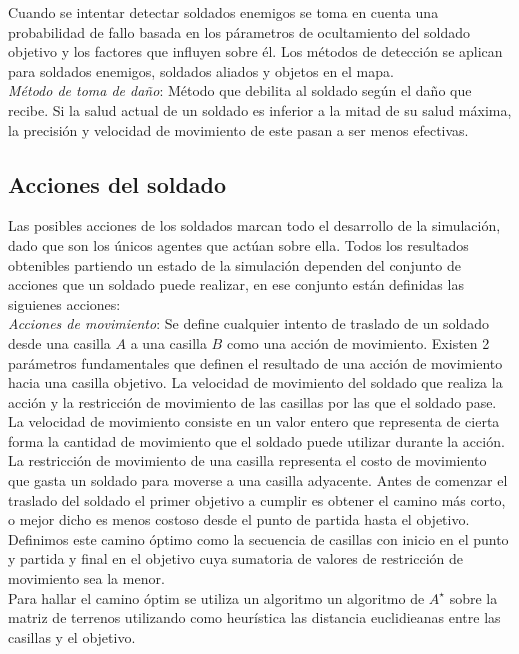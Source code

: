 \documentclass{llncs}
\begin{document}
Cuando se intentar detectar soldados enemigos se toma en cuenta una probabilidad de fallo basada en los p\'arametros de ocultamiento del soldado objetivo y los factores que influyen sobre \'el.
Los m\'etodos de detecci\'on se aplican para soldados enemigos, soldados aliados y objetos en el mapa.\\

\emph{M\'etodo de toma de da\~no}: M\'etodo que debilita al soldado seg\'un el da\~no que recibe. Si la salud actual de un soldado es inferior a la mitad de su salud m\'axima, la precisi\'on y velocidad de movimiento de este pasan a ser menos efectivas.

\subsection{Acciones del soldado}

Las posibles acciones de los soldados marcan todo el desarrollo de la simulaci\'on, dado que son los \'unicos agentes que act\'uan sobre ella. Todos los resultados obtenibles partiendo un estado de la simulaci\'on dependen del conjunto de acciones que un soldado puede realizar, en ese conjunto est\'an definidas las siguienes acciones:\\

\emph{Acciones de movimiento}: Se define cualquier intento de traslado de un soldado desde una casilla $A$ a una casilla $B$ como una acci\'on de movimiento.
 Existen 2 par\'ametros fundamentales que definen el resultado de una acci\'on de movimiento hacia una casilla objetivo. La velocidad de movimiento del soldado que realiza la acci\'on y la restricci\'on de movimiento de las casillas por las que el soldado pase.
 La velocidad de movimiento consiste en un valor entero que representa de cierta forma la cantidad de movimiento que el soldado puede utilizar durante la acci\'on.
 La restricci\'on de movimiento de una casilla representa el costo de movimiento que gasta un soldado para moverse a una casilla adyacente.
 Antes de comenzar el traslado del soldado el primer objetivo a cumplir es obtener el camino m\'as corto, o mejor dicho es menos costoso desde el punto de partida hasta el objetivo. Definimos este camino \'optimo como la secuencia de casillas con inicio en el punto y partida y final en el objetivo cuya sumatoria de valores de restricci\'on de movimiento sea la menor.\\
 
Para hallar el camino \'optim se utiliza un algoritmo un algoritmo de $A^\star$ sobre la matriz de terrenos utilizando como heur\'istica las distancia euclidieanas entre las casillas y el objetivo.
\end{document}
